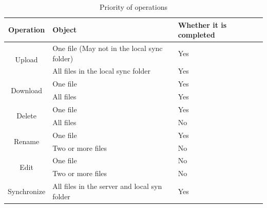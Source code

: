 \documentclass[a4paper]{article}
\begin{document}
{\begin{table}[h]
\caption{Priority of operations}
\centering
\begin{tabular}{|c|p{8cm}|p{2cm}|}
\hline
Operation & Object & Whether it is completed \\
\hline
\multirow{2}{*}{Upload}&{One file (May not in the local sync folder)}&Yes\\
\cline{2-3}
&All files in the local sync folder&Yes\\
\cline{1-3}
\multirow{2}{*}{Download}&{One file}&Yes\\
\cline{2-3}
&All files&Yes\\
\cline{1-3}
\multirow{2}{*}{Delete}&{One file}&Yes\\
\cline{2-3}
&All files&No\\
\cline{1-3}
\multirow{2}{*}{Rename}&{One file}&Yes\\
\cline{2-3}
&Two or more files&No\\
\cline{1-3}
\multirow{2}{*}{Edit}&{One file}&No\\
\cline{2-3}
&Two or more files&No\\
\cline{1-3}
\multirow{1}{*}{Synchronize}&{All files in the server and local syn folder}&Yes\\

\bottomrule
\end{tabular}
\end{table}

}
\end{document}
